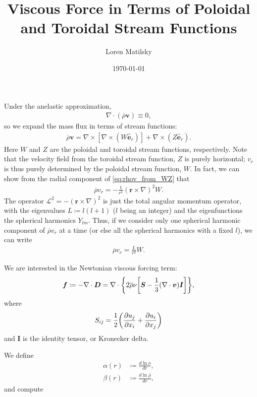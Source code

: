 \documentclass[12pt]{article} %
\date{\today}
\author{Loren Matilsky}
\title{Viscous Force in Terms of Poloidal and Toroidal Stream Functions}
\newcommand{\pderiv}[2]{\frac{\partial#1}{\partial#2}}
\newcommand{\e}{\hat{\bm{e}}}
\newcommand{\rhobar}{\overline{\rho}}
\newcommand{\curl}{\nabla\times}
\newcommand{\Div}{\nabla\cdot}
\begin{document}
	\maketitle
	Under the anelastic approximation, 
	\begin{align}
	\Div(\rhobar\bm{v})\equiv 0,
	\label{eq:anelastic}
	\end{align}
	so we expand the mass flux in terms of stream functions:
	\begin{align}
	\rhobar\bm{v} = \curl[\curl(W\e_r)] + \curl(Z\e_r). 
	\label{eq:rhov_from_WZ}
	\end{align}
	Here $W$ and $Z$ are the poloidal and toroidal stream functions, respectively. Note that the velocity field from the toroidal stream function, $Z$ is purely horizontal; $v_r$ is thus purely determined by the poloidal stream function, $W$. In fact, we can show from the radial component of \eqref{eq:rhov_from_WZ} that
	\begin{align}
	\rhobar v_r = -\frac{1}{r^2}(\bm{r}\times\nabla)^2W.
	\end{align}
	The operator $\mathscr{L}^2 = -(\bm{r}\times\nabla)^2$ is just the total angular momentum operator, with the eigenvalues $L\coloneqq l(l+1)$ ($l$ being an integer) and the eigenfunctions the spherical harmonics $Y_{lm}$. Thus, if we consider only one spherical harmonic component of $\rhobar v_r$ at a time (or else all the spherical harmonics with a fixed $l$), we can write
	\begin{align}
	\rhobar v_r = \frac{L}{r^2}W.
	\label{eq:rhovr_from_W}
	\end{align}
	
	We are interested in the Newtonian viscous forcing term:
	\begin{align}
	\bm{f} \coloneqq -\nabla\cdot\bm{D} = \nabla \cdot\bigg{\{}2\rhobar\nu\bigg{[}\bm{S}-\frac{1}{3}(\nabla\cdot\bm{v})\bm{I}\bigg{]}\bigg{\}},
	\end{align}
	where 
	\begin{align}
	S_{ij} = \frac{1}{2}\bigg{(}\pderiv{u_j}{x_i}+\pderiv{u_i}{x_j}\bigg{)}
	\end{align}
	and $\bm{I}$ is the identity tensor, or Kronecker delta. 
	
	We define
	\begin{align}
	\alpha(r) &\coloneqq \frac{d\ln\nu}{dr},\\
	\beta(r) &\coloneqq \frac{d\ln\rhobar}{dr},
	\end{align}
	and compute
	
\end{document}
